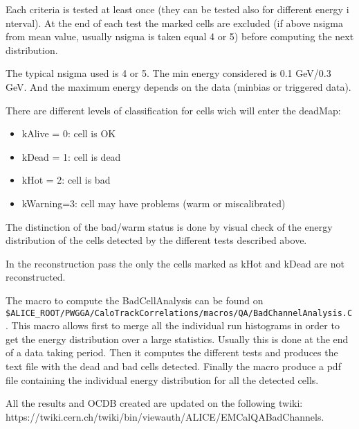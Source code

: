 Each criteria is tested at least once (they can be tested also for different energy i nterval). At the end of each test the marked cells are excluded (if above nsigma from mean value, usually nsigma is taken equal 4 or 5) before computing the next distribution. 

The typical nsigma used is 4 or 5.
The min energy considered is 0.1 GeV/0.3 GeV.  And the maximum energy depends on the data (minbias or triggered data). 


There are different levels of classification for  cells wich will enter the deadMap:
\begin{itemize}
\item kAlive = 0: cell is OK
\item kDead = 1: cell is dead 
\item kHot = 2: cell is bad
\item kWarning=3: cell may have problems (warm or miscalibrated)
\end{itemize}

The distinction of the bad/warm status is done by visual check of the energy distribution of the cells detected by the different tests described above.

In the reconstruction pass the only the cells marked as kHot and kDead are not reconstructed. 

The macro to compute the BadCellAnalysis can be found on \\ \texttt{\$ALICE\_ROOT/PWGGA/CaloTrackCorrelations/macros/QA/BadChannelAnalysis.C}. This macro allows first to merge all the individual run histograms in order to get the energy distribution over a large statistics. Usually this is done at the end of a data taking period. Then it computes the different tests and produces the text file with the dead and bad cells detected. Finally the macro produce a pdf file containing the individual energy distribution for all the detected cells.

All the results and  OCDB created are updated on the following twiki:\\
https://twiki.cern.ch/twiki/bin/viewauth/ALICE/EMCalQABadChannels.

